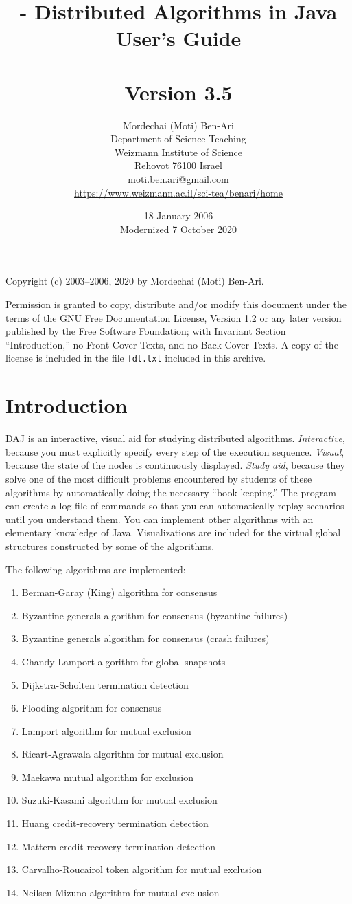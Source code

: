 \documentclass[11pt]{article}
\title{\daj{} - Distributed Algorithms in Java\\User's Guide\\\mbox{}\\\large{Version 3.5}}
\author{Mordechai (Moti) Ben-Ari\\
Department of Science Teaching\\
Weizmann Institute of Science\\
Rehovot 76100 Israel\\
\textsf{moti.ben.ari@gmail.com}\\
\url{https://www.weizmann.ac.il/sci-tea/benari/home}}
\date{18 January 2006\\\smallskip
Modernized 7 October 2020}
\newcommand{\daj}{\textsc{DAJ}}
\newcommand{\p}[1]{\texttt{#1}}
\begin{document}
\maketitle
\thispagestyle{empty}

\vfil

\begin{center}
Copyright (c) 2003--2006, 2020 by Mordechai (Moti) Ben-Ari.
\end{center}
Permission is granted to copy, distribute and/or modify this document
under the terms of the GNU Free Documentation License, Version 1.2
or any later version published by the Free Software Foundation;
with Invariant Section ``Introduction,'' no Front-Cover Texts, and no Back-Cover Texts.
A copy of the license is included in the file \p{fdl.txt}
included in this archive.
\vfil
\newpage

\section{Introduction}

\daj{} is an interactive, visual aid for studying distributed
algorithms. \emph{Interactive}, because you must explicitly
specify every step of the execution sequence.
\emph{Visual}, because the state of the nodes is continuously
displayed. \emph{Study aid}, because they solve one of the most
difficult problems encountered by students of these algorithms
by automatically doing the necessary ``book-keeping.'' The
program can create a log file of commands so that you can
automatically replay scenarios until you understand them. You can implement other algorithms with an elementary knowledge of Java.
Visualizations are included for the virtual global structures
constructed by some of the algorithms.

The following algorithms are implemented:
\begin{enumerate}
\item Berman-Garay (King) algorithm for consensus
\item Byzantine generals algorithm for consensus (byzantine failures)
\item Byzantine generals algorithm for consensus (crash failures)
\item Chandy-Lamport algorithm for global snapshots
\item Dijkstra-Scholten termination detection
\item Flooding algorithm for consensus
\item Lamport algorithm for mutual exclusion
\item Ricart-Agrawala algorithm for mutual exclusion
\item Maekawa mutual algorithm for exclusion
\item Suzuki-Kasami algorithm for mutual exclusion
\item Huang credit-recovery termination detection
\item Mattern credit-recovery termination detection
\item Carvalho-Roucairol token algorithm for mutual exclusion
\item Neilsen-Mizuno algorithm for mutual exclusion
\end{enumerate}
\end{document}
